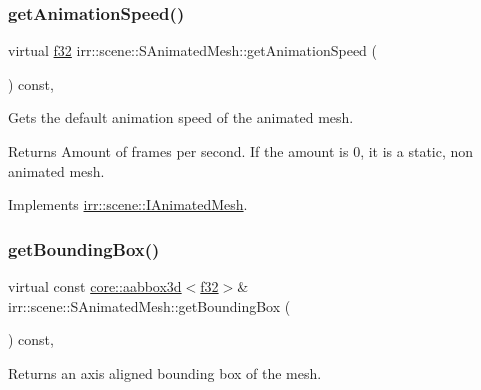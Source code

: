 \subsubsection{\texorpdfstring{get\+Animation\+Speed()}{getAnimationSpeed()}\hspace{0.1cm}{\footnotesize\ttfamily [2/2]}}
{\footnotesize\ttfamily virtual \hyperlink{namespaceirr_a0277be98d67dc26ff93b1a6a1d086b07}{f32} irr\+::scene\+::\+S\+Animated\+Mesh\+::get\+Animation\+Speed (\begin{DoxyParamCaption}{ }\end{DoxyParamCaption}) const\hspace{0.3cm}{\ttfamily [inline]}, {\ttfamily [virtual]}}



Gets the default animation speed of the animated mesh. 

\begin{DoxyReturn}{Returns}
Amount of frames per second. If the amount is 0, it is a static, non animated mesh. 
\end{DoxyReturn}


Implements \hyperlink{classirr_1_1scene_1_1IAnimatedMesh_acb4249295319c8240d5bedc167417435}{irr\+::scene\+::\+I\+Animated\+Mesh}.

\mbox{\label{structirr_1_1scene_1_1SAnimatedMesh_a1494406ce8f11d47fd1e3b4af825e88f}} 
\subsubsection{\texorpdfstring{get\+Bounding\+Box()}{getBoundingBox()}\hspace{0.1cm}{\footnotesize\ttfamily [1/2]}}
{\footnotesize\ttfamily virtual const \hyperlink{classirr_1_1core_1_1aabbox3d}{core\+::aabbox3d}$<$\hyperlink{namespaceirr_a0277be98d67dc26ff93b1a6a1d086b07}{f32}$>$\& irr\+::scene\+::\+S\+Animated\+Mesh\+::get\+Bounding\+Box (\begin{DoxyParamCaption}{ }\end{DoxyParamCaption}) const\hspace{0.3cm}{\ttfamily [inline]}, {\ttfamily [virtual]}}



Returns an axis aligned bounding box of the mesh. 

